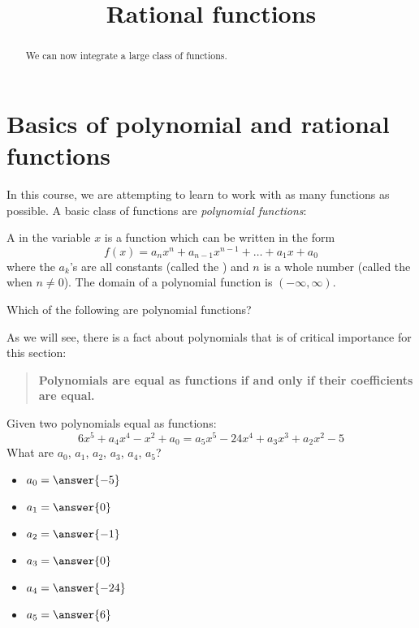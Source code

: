 \documentclass{ximera}
\title[Dig-In:]{Rational functions}
\begin{document}
\begin{abstract}
We can now integrate a large class of functions.  
\end{abstract}
\maketitle

\section{Basics of polynomial and rational functions}

In this course, we are attempting to learn to work with as many
functions as possible. A basic class of functions are \textit{polynomial functions}:

\begin{definition}
  A  in the variable $x$ is a function
  which can be written in the form
  \[
  f(x) = a_nx^n + a_{n-1}x^{n-1} + \dots + a_1 x + a_0
  \]
  where the $a_k$'s are all constants (called the )
  and $n$ is a whole number (called the  when $n\ne
  0$). The domain of a polynomial function is $(-\infty,\infty)$.
\end{definition}

\begin{question}
  Which of the following are polynomial functions?
  \begin{selectAll}
  \end{selectAll}
\end{question}

As we will see, there is a fact about polynomials that is of critical
importance for this section:
\begin{quote}
  \textbf{Polynomials are equal as functions if and only if their
    coefficients are equal.}
\end{quote}

\begin{question}
  Given two polynomials equal as functions:
  \[
  6x^5+a_4 x^4 -x^2 + a_0 = a_5 x^5 - 24 x^4 + a_3 x^3 + a_2 x^2 - 5
  \]
  What are $a_0$, $a_1$, $a_2$, $a_3$, $a_4$, $a_5$?
  \begin{prompt}
    \begin{itemize}
    \item $a_0 = \answer{-5}$
    \item $a_1 = \answer{0}$
    \item $a_2 = \answer{-1}$
    \item $a_3 = \answer{0}$
    \item $a_4 = \answer{-24}$
    \item $a_5 = \answer{6}$
    \end{itemize}
  \end{prompt}
\end{question}
\end{document}
